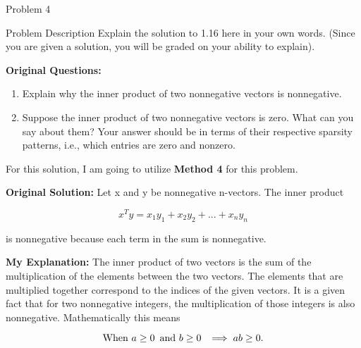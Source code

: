 \begin{problem}{Problem 4}
    \begin{statement}{Problem Description}
        Explain the solution to 1.16 here in your own words. (Since you are given a solution, you will be graded on your ability to explain). \vspace*{1em}

        \textbf{Original Questions:}
        
        \begin{enumerate}[label=(\alph*)]
            \item Explain why the inner product of two nonnegative vectors is nonnegative.
            \item Suppose the inner product of two nonnegative vectors is zero. What can you say about them? Your answer should be in terms of their respective sparsity patterns,
            i.e., which entries are zero and nonzero.
        \end{enumerate}
    \end{statement}

    \begin{highlight}
        For this solution, I am going to utilize \textbf{Method 4} for this problem. \vspace*{1em}

        \textbf{Original Solution:} Let x and y be nonnegative n-vectors. The inner product

        \setcounter{equation}{0}
        \begin{equation}
            x^{T}y = x_{1}y_{1} + x_{2}y_{2} + ... + x_{n}y_{n}
        \end{equation}

        is nonnegative because each term in the sum is nonnegative. \vspace*{1em}

        \textbf{My Explanation:} The inner product of two vectors is the sum of the multiplication of the elements between the two vectors. The elements that are multiplied together correspond to the 
        indices of the given vectors. It is a given fact that for two nonnegative integers, the multiplication of those integers is also nonnegative. Mathematically this means

        \begin{equation}
            \text{When } a \geq 0 \hspace*{5pt} \text{and } b \geq 0 \hspace*{5pt} \implies ab \geq 0.
        \end{equation}


\end{highlight}
\end{problem}
